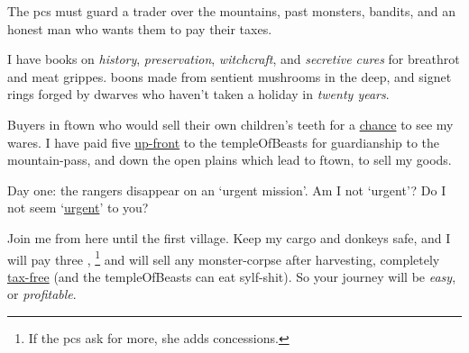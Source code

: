 \documentclass[10pt,twoside]{book}
\begin{document}
{
  \noindent
  The \glspl{pc} must guard a trader over the mountains, past \glspl{monster}, bandits, and an honest man who wants them to pay their taxes.




}

\clearpage

\pagestyle{minizine}


\begin{speechtext}
  I have books on \emph{history}, \emph{preservation}, \emph{witchcraft}, and \emph{secretive cures} for breathrot and meat grippes.
  \Glspl{boon} made from sentient mushrooms in the \gls{deep}, and signet rings forged by dwarves who haven't taken a holiday in \emph{twenty years}.

  Buyers in \gls{ftown} who would sell their own children's teeth for a \underline{chance} to see my wares.
  I have paid five  \underline{up-front} to the \gls{templeOfBeasts} for guardianship to the mountain-pass, and down the open plains which lead to \gls{ftown}, to sell my goods.

  Day one: the \glspl{ranger} disappear on an `urgent mission'.
  Am I not `urgent'?
  Do I not seem `\underline{urgent}' to you?

  Join me from here until the first \gls{village}.
  Keep my cargo and donkeys safe, and I will pay three ,%
  \footnote{If the \glspl{pc} ask for more, she adds concessions.}
  and will sell any \gls{monster}-corpse after \gls{harvesting}, completely \underline{tax-free} (and the \gls{templeOfBeasts} can eat \gls{sylf}-shit).
  So your journey will be \emph{easy}, or \emph{profitable}.
\end{speechtext}
\end{document}
